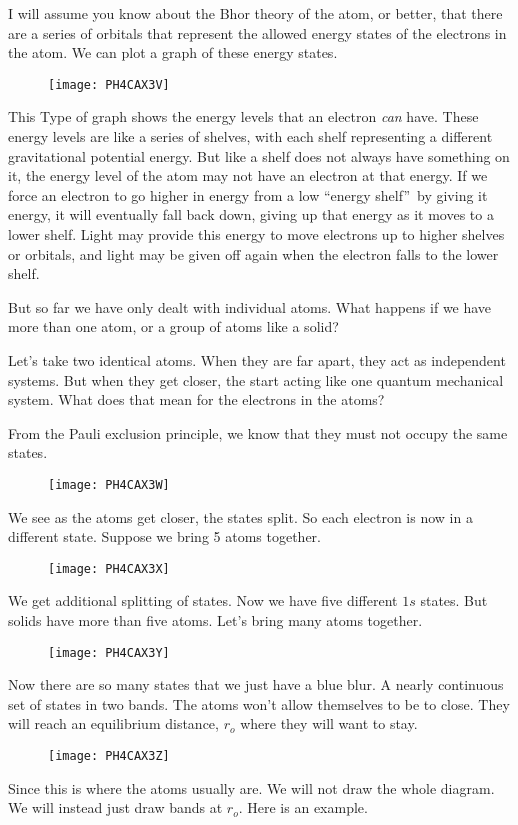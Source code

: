 I will assume you know about the Bhor theory of the atom, or better, that
there are a series of orbitals that represent the allowed energy states of
the electrons in the atom. We can plot a graph of these energy states.
\begin{figure}[h!]
\texttt{[image: PH4CAX3V]}
\end{figure}%
This Type of graph shows the energy levels that an electron \emph{can} have.
These energy levels are like a series of shelves, with each shelf
representing a different gravitational potential energy. But like a shelf
does not always have something on it, the energy level of the atom may not
have an electron at that energy. If we force an electron to go higher in
energy from a low \textquotedblleft energy shelf\textquotedblright\ by
giving it energy, it will eventually fall back down, giving up that energy
as it moves to a lower shelf. Light may provide this energy to move
electrons up to higher shelves or orbitals, and light may be given off again
when the electron falls to the lower shelf.\newline

But so far we have only dealt with individual atoms. What happens if we have
more than one atom, or a group of atoms like a solid?

Let's take two identical atoms. When they are far apart, they act as
independent systems. But when they get closer, the start acting like one
quantum mechanical system. What does that mean for the electrons in the
atoms?

From the Pauli exclusion principle, we know that they must not occupy the
same states.\begin{figure}[h!]
\texttt{[image: PH4CAX3W]}
\end{figure}We see as the atoms get closer,
the states split. So each electron is now in a different state. Suppose we
bring 5 atoms together.\begin{figure}[h!]
\texttt{[image: PH4CAX3X]}
\end{figure}We get additional splitting of
states. Now we have five different $1s$ states. But solids have more than
five atoms. Let's bring many atoms together.\begin{figure}[h!]
\texttt{[image: PH4CAX3Y]}
\end{figure}Now there are so many states that
we just have a blue blur. A nearly continuous set of states in two bands.
The atoms won't allow themselves to be to close. They will reach an
equilibrium distance, $r_{o}$ where they will want to stay. \begin{figure}[h!]
\texttt{[image: PH4CAX3Z]}
\end{figure}%
Since this is where the atoms usually are. We will not draw the whole
diagram. We will instead just draw bands at $r_{o}.$ Here is an example.

